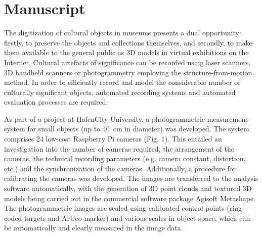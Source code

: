 \documentclass{isprs} %
\begin{document}

\maketitle


\section{Manuscript}\label{MANUSCRIPT}

\sloppy
The digitization of cultural objects in museums presents a dual opportunity: firstly, to preserve the objects and
collections themselves, and secondly, to make them available to the general public as 3D models in virtual
exhibitions on the Internet. Cultural artefacts of significance can be recorded using laser scanners, 3D handheld
scanners or photogrammetry employing the structure-from-motion method. In order to efficiently record and
model the considerable number of culturally significant objects, automated recording systems and automated
evaluation processes are required.

As part of a project at HafenCity University, a photogrammetric measurement system for small objects (up to \SI{40}{\centi\metre} in diameter) was developed. The system comprises 24 low-cost Raspberry Pi cameras (Fig. 1). This entailed
an investigation into the number of cameras required, the arrangement of the cameras, the technical recording
parameters (e.g. camera constant, distortion, etc.) and the synchronization of the cameras. Additionally, a
procedure for calibrating the cameras was developed. The images are transferred to the analysis software
automatically, with the generation of 3D point clouds and textured 3D models being carried out in the
commercial software package Agisoft Metashape. The photogrammetric images are scaled using calibrated
control points (ring coded targets and ArUco marker) and various scales in object space, which can be
automatically and clearly measured in the image data.
\end{document}
